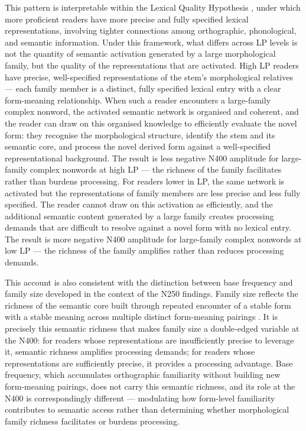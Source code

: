 \documentclass[utf8]{FrontiersinHarvard} %
\begin{document}
	This pattern is interpretable within the Lexical Quality Hypothesis \citep{Perfetti2007}, under which more proficient readers have more precise and fully specified lexical representations, involving tighter connections among orthographic, phonological, and semantic information. Under this framework, what differs across LP levels is not the quantity of semantic activation generated by a large morphological family, but the quality of the representations that are activated. High LP readers have precise, well-specified representations of the stem's morphological relatives --- each family member is a distinct, fully specified lexical entry with a clear form-meaning relationship. When such a reader encounters a large-family complex nonword, the activated semantic network is organised and coherent, and the reader can draw on this organised knowledge to efficiently evaluate the novel form: they recognise the morphological structure, identify the stem and its semantic core, and process the novel derived form against a well-specified representational background. The result is less negative N400 amplitude for large-family complex nonwords at high LP --- the richness of the family facilitates rather than burdens processing. For readers lower in LP, the same network is activated but the representations of family members are less precise and less fully specified. The reader cannot draw on this activation as efficiently, and the additional semantic content generated by a large family creates processing demands that are difficult to resolve against a novel form with no lexical entry. The result is more negative N400 amplitude for large-family complex nonwords at low LP --- the richness of the family amplifies rather than reduces processing demands.
	
	This account is also consistent with the distinction between base frequency and family size developed in the context of the N250 findings. Family size reflects the richness of the semantic core built through repeated encounter of a stable form with a stable meaning across multiple distinct form-meaning pairings \citep{Bolger2008, Li2026}. It is precisely this semantic richness that makes family size a double-edged variable at the N400: for readers whose representations are insufficiently precise to leverage it, semantic richness amplifies processing demands; for readers whose representations are sufficiently precise, it provides a processing advantage. Base frequency, which accumulates orthographic familiarity without building new form-meaning pairings, does not carry this semantic richness, and its role at the N400 is correspondingly different --- modulating how form-level familiarity contributes to semantic access rather than determining whether morphological family richness facilitates or burdens processing.
	
\end{document}
